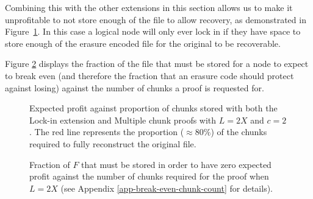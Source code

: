 \documentclass[12pt,a4paper,twoside,openright]{report}
\begin{document}
Combining this with the other extensions in this section allows us to make it unprofitable to not store enough of the file to allow recovery,
as demonstrated in Figure~\ref{eval-graph-erasure}.
In this case a logical node will only ever lock in if they have space to store enough of the erasure encoded file for the
original to be recoverable.

Figure \ref{break-even-chunks} displays the fraction of the file that must be stored for a node to expect to break even
(and therefore the fraction that an erasure code should protect against losing)
against the number of chunks a proof is requested for.



\begin{figure}[h]

\caption[Expected attacker profit: erasure code]{Expected profit against proportion of chunks stored with both the Lock-in extension and Multiple chunk proofs with $L = 2X$ and $c = 2$.
The red line represents the proportion ($\approx80\%$) of the chunks required to fully reconstruct the original file.}
\label{eval-graph-erasure}
\end{figure}

\FloatBarrier
\begin{figure}[h]

\caption[Chunks to break even]{Fraction of $F$ that must be stored in order to have zero expected profit against the number of chunks required for the proof
when $L = 2X$ (see Appendix \ref{app-break-even-chunk-count} for details).} 
\label{break-even-chunks}
\end{figure}
\end{document}
